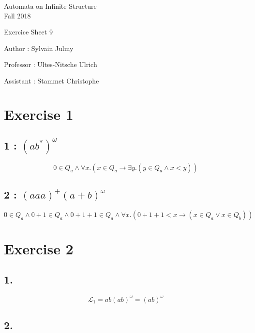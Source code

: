 \documentclass[a4paper,11pt]{report}
\author{Sylvain Julmy}
\date{\today}
\begin{document}
\begin{center}
  \Large{
    Automata on Infinite Structure\\
    Fall 2018
  }
  
  \noindent\makebox[\linewidth]{\rule{\linewidth}{0.4pt}}
  Exercice Sheet 9

  \vspace*{1cm}

  Author : Sylvain Julmy
  \noindent\makebox[\linewidth]{\rule{\linewidth}{0.4pt}}

  \begin{flushleft}
    Professor : Ultes-Nitsche Ulrich
    
    Assistant : Stammet Christophe
  \end{flushleft}

  \noindent\makebox[\linewidth]{\rule{\textwidth}{1pt}}
\end{center}

\section*{Exercise 1}

\subsection*{1 : $(ab^*)^\omega$}

\[
  0 \in Q_a \wedge \forall x.(x \in Q_a \to \exists y.(y \in Q_a \wedge x < y))
\]

\subsection*{2 : $(aaa)^+(a+b)^\omega$}

\[
  0 \in Q_a \wedge
  0 + 1 \in Q_a \wedge
  0 + 1 + 1 \in Q_a \wedge
  \forall x.( 0 + 1 + 1 < x \to (x \in Q_a \vee x \in Q_b))
\]

\section*{Exercise 2}

\subsection*{1. }

\[
  \mathcal{L}_1 = ab(ab)^\omega = (ab)^\omega
\]

\subsection*{2. }
\end{document}
